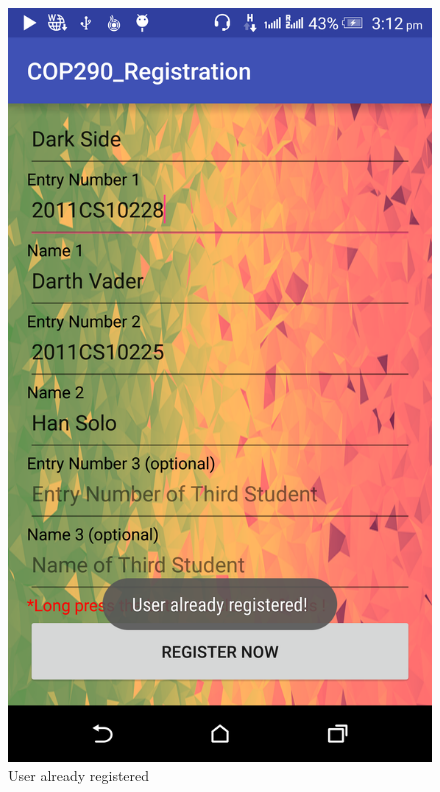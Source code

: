 \documentclass[12pt]{article}
\begin{document}
\begin{figure}[!htb]
\begin{minipage}[b]{0.4\textwidth}
    \includegraphics[width=\textwidth]{images/already.png}
    \caption{User already registered}
  \end{minipage}
\end{figure}

\FloatBarrier
\end{document}
